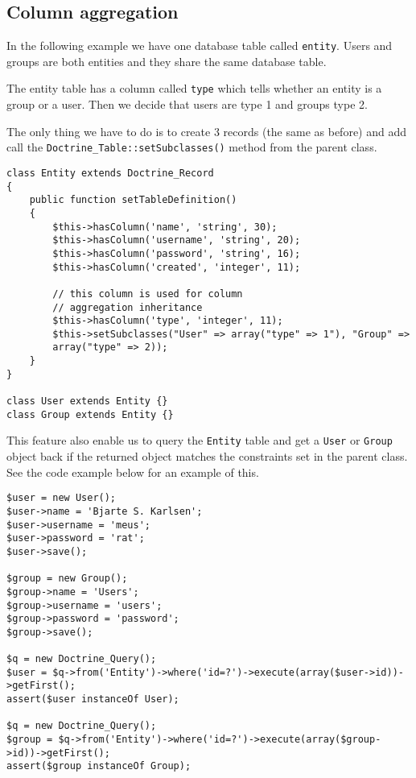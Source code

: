 \documentclass[11pt,a4paper]{report}
\begin{document}
\subsection{Column aggregation}
In the following example we have one database table called \texttt{entity}. Users and groups are both entities and they share the same database table.

The entity table has a column called \texttt{type} which tells whether an entity is a group or a user. Then we decide that users are type 1 and groups type 2.

The only thing we have to do is to create 3 records (the same as before) and add\newline
call the \texttt{Doctrine\_Table::setSubclasses()} method from the parent class.

\begin{verbatim}
class Entity extends Doctrine_Record
{
    public function setTableDefinition()
    {
        $this->hasColumn('name', 'string', 30);
        $this->hasColumn('username', 'string', 20);
        $this->hasColumn('password', 'string', 16);
        $this->hasColumn('created', 'integer', 11);

        // this column is used for column
        // aggregation inheritance
        $this->hasColumn('type', 'integer', 11);
        $this->setSubclasses("User" => array("type" => 1"), "Group" =>
        array("type" => 2));
    }
}

class User extends Entity {}
class Group extends Entity {}
\end{verbatim}

This feature also enable us to query the \texttt{Entity} table and get a \texttt{User} or\newline
\texttt{Group} object back if the returned object matches the constraints set in the\newline
parent class. See the code example below for an example of this.

\begin{verbatim}
$user = new User();
$user->name = 'Bjarte S. Karlsen';
$user->username = 'meus';
$user->password = 'rat';
$user->save();

$group = new Group();
$group->name = 'Users';
$group->username = 'users';
$group->password = 'password';
$group->save();

$q = new Doctrine_Query();
$user = $q->from('Entity')->where('id=?')->execute(array($user->id))->getFirst();
assert($user instanceOf User);

$q = new Doctrine_Query();
$group = $q->from('Entity')->where('id=?')->execute(array($group->id))->getFirst();
assert($group instanceOf Group);
\end{verbatim}
\end{document}
